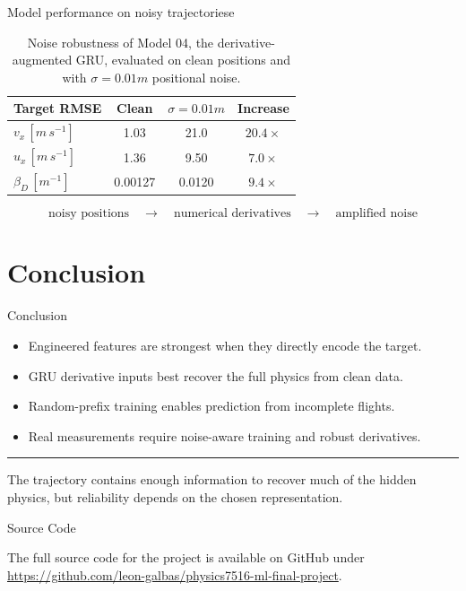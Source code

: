 \documentclass[10pt]{beamer}
\begin{document}
\begin{frame}{Model performance on noisy trajectoriese}
  \begin{table}
    \centering
    \begin{tabular}{@{}lccc@{}}
      \toprule
      Target RMSE & Clean & $\sigma=0.01\unit{m}$ & Increase \\
      \midrule
      $v_x\,[\unit{m\,s^{-1}}]$
        & 1.03 & 21.0 & \textcolor{accent}{$20.4\times$} \\
      $u_x\,[\unit{m\,s^{-1}}]$
        & 1.36 & 9.50 & \textcolor{accent}{$7.0\times$} \\
      $\beta_D\,[\unit{m^{-1}}]$
        & 0.00127 & 0.0120 & \textcolor{accent}{$9.4\times$} \\
      \bottomrule
    \end{tabular}
    \caption{Noise robustness of Model 04, the derivative-augmented GRU,
      evaluated on clean positions and with
      \(\sigma=0.01\unit{m}\) positional noise.}
  \end{table}

  \vspace{0.75cm}
  \[
    \text{noisy positions}
    \quad\longrightarrow\quad
    \text{numerical derivatives}
    \quad\longrightarrow\quad
    \text{amplified noise}
  \]
\end{frame}

\section{Conclusion}

\begin{frame}{Conclusion}
  \begin{itemize}
    \setlength{\itemsep}{0.65em}
    \item Engineered features are strongest when they directly encode the target.
    \item GRU derivative inputs best recover the full physics from clean data.
    \item Random-prefix training enables prediction from incomplete flights.
    \item Real measurements require noise-aware training and robust derivatives.
  \end{itemize}

  \vfill
  {\color{rulegray}\hrule}
  \vspace{0.35cm}
  \begin{center}
    The trajectory contains enough information to recover much of the hidden
    physics, but reliability depends on the chosen representation.
  \end{center}
\end{frame}

\begin{frame}{Source Code}
    \begin{center}
        The full source code for the project is available on GitHub under \url{https://github.com/leon-galbas/physics7516-ml-final-project}.
    \end{center}
\end{frame}
\end{document}
